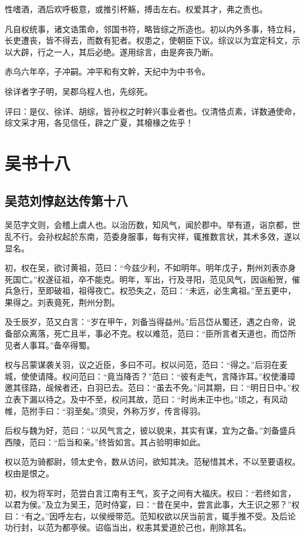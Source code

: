 \documentclass[12pt,UTF8]{ctexbook}
\begin{document}
性嗜酒，酒后欢呼极意，或推引杯觞，搏击左右。权爱其才，弗之责也。

凡自权统事，诸文诰策命，邻国书符，略皆综之所造也。初以内外多事，特立科，长吏遭丧，皆不得去，而数有犯者。权患之，使朝臣下议。综议以为宜定科文，示以大辟，行之一人，其后必绝。遂用综言，由是奔丧乃断。

赤乌六年卒，子冲嗣。冲平和有文幹，天纪中为中书令。

徐详者字子明，吴郡乌程人也，先综死。

评曰：是仪、徐详、胡综，皆孙权之时幹兴事业者也。仪清恪贞素，详数通使命，综文采才用，各见信任，辟之广夏，其榱椽之佐乎！

\part{吴书十八}
\chapter{吴范刘惇赵达传第十八}

吴范字文则，会稽上虞人也。以治历数，知风气，闻於郡中。举有道，诣京都，世乱不行。会孙权起於东南，范委身服事，每有灾祥，辄推数言状，其术多效，遂以显名。

初，权在吴，欲讨黄祖，范曰：“今兹少利，不如明年。明年戊子，荆州刘表亦身死国亡。”权遂征祖，卒不能克。明年，军出，行及寻阳，范见风气，因诣船贺，催兵急行，至即破祖，祖得夜亡。权恐失之，范曰：“未远，必生禽祖。”至五更中，果得之。刘表竟死，荆州分割。

及壬辰岁，范又白言：“岁在甲午，刘备当得益州。”后吕岱从蜀还，遇之白帝，说备部众离落，死亡且半，事必不克。权以难范，范曰：“臣所言者天道也，而岱所见者人事耳。”备卒得蜀。

权与吕蒙谋袭关羽，议之近臣，多曰不可。权以问范，范曰：“得之。”后羽在麦城，使使请降。权问范曰：“竟当降否？”范曰：“彼有走气，言降诈耳。”权使潘璋邀其径路，觇候者还，白羽已去。范曰：“虽去不免。”问其期，曰：“明日日中。”权立表下漏以待之。及中不至，权问其故，范曰：“时尚未正中也。”顷之，有风动帷，范拊手曰：“羽至矣。”须臾，外称万岁，传言得羽。

后权与魏为好，范曰：“以风气言之，彼以貌来，其实有谋，宜为之备。”刘备盛兵西陵，范曰：“后当和亲。”终皆如言。其占验明审如此。

权以范为骑都尉，领太史令，数从访问，欲知其决。范秘惜其术，不以至要语权。权由是恨之。

初，权为将军时，范尝白言江南有王气，亥子之间有大福庆。权曰：“若终如言，以君为侯。”及立为吴王，范时侍宴，曰：“昔在吴中，尝言此事，大王识之邪？”权曰：“有之。”因呼左右，以侯绶带范。范知权欲以厌当前言，辄手推不受。及后论功行封，以范为都亭侯。诏临当出，权恚其爱道於己也，削除其名。
\end{document}

